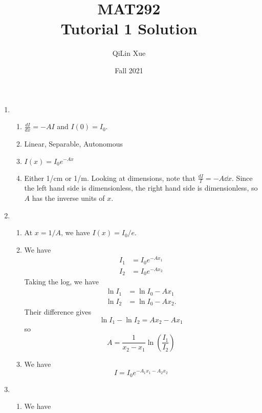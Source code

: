 \documentclass{article}
\title{MAT292 \\ Tutorial 1 Solution}
\author{QiLin Xue}
\date{Fall 2021}
\begin{document}
\newcommand{\tabitem}{~~\llap{\textbullet}~~}

\maketitle
\begin{enumerate}
    \item \begin{enumerate}
        \item $\frac{dI}{dx} = -AI$ and $I(0)=I_0.$
        \item Linear, Separable, Autonomous
        \item $I(x)=I_0e^{-Ax}$
        \item Either 1/cm or 1/m. Looking at dimensions, note that $\frac{dI}{I}=-A\dd{x}$. Since the left hand side is dimensionless, the right hand side is dimensionless, so $A$ has the inverse units of $x$.
    \end{enumerate}
    \item \begin{enumerate}
        \item At $x=1/A$, we have $I(x) = I_0/e.$
        \item We have
        \begin{align}
            I_1 &= I_0e^{-Ax_1} \\ 
            I_2 &= I_0e^{-Ax_2}
        \end{align}
        Taking the log, we have 
        \begin{align}
            \ln I_1 &= \ln I_0 - Ax_1 \\ 
            \ln I_2 &= \ln I_0 - Ax_2.
        \end{align}
        Their difference gives
        \begin{equation*}
            \ln I_1 - \ln I_2 = Ax_2 - Ax_1
        \end{equation*}
        so 
        \begin{equation}
            A = \frac{1}{x_2-x_1}\ln\left(\frac{I_1}{I_2}\right)
        \end{equation}
        \item We have 
        \begin{equation}
            I = I_0e^{-A_1x_1-A_2x_2}
        \end{equation}
    \end{enumerate}
    \item \begin{enumerate}
        \item We have

\end{enumerate}
\end{enumerate}
\end{document}
